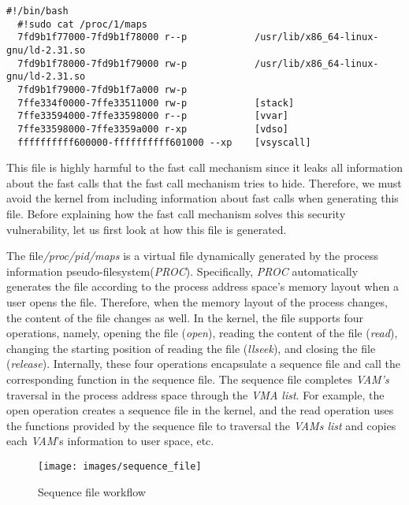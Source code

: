  
\begin{lstlisting}[style=BASHStyle]
  #!/bin/bash
  #!sudo cat /proc/1/maps
  7fd9b1f77000-7fd9b1f78000 r--p            /usr/lib/x86_64-linux-gnu/ld-2.31.so
  7fd9b1f78000-7fd9b1f79000 rw-p            /usr/lib/x86_64-linux-gnu/ld-2.31.so
  7fd9b1f79000-7fd9b1f7a000 rw-p  
  7ffe334f0000-7ffe33511000 rw-p            [stack]
  7ffe33594000-7ffe33598000 r--p            [vvar]
  7ffe33598000-7ffe3359a000 r-xp            [vdso]
  ffffffffff600000-ffffffffff601000 --xp    [vsyscall]
\end{lstlisting}

This file is highly harmful to the fast call mechanism since 
it leaks all information about the fast calls that the fast call 
mechanism tries to hide. Therefore, we must avoid the kernel from 
including information about fast calls when generating this file. 
Before explaining how the fast call mechanism solves this security 
vulnerability, let us first look at how this file is generated.

The file\emph{/proc/pid/maps} is a virtual file dynamically
generated by the process information pseudo-filesystem\cite{23}(\emph{PROC}). 
Specifically, \emph{PROC} automatically generates the file according to 
the process address space's memory layout when a user opens the file. 
Therefore, when the memory layout of the process changes, the content 
of the file changes as well. In the kernel, the file supports four operations, 
namely, opening the file (\emph{open}), reading the content of the file (\emph{read}), 
changing the starting position of reading the file (\emph{llseek}), and 
closing the file (\emph{release}).  Internally, these four operations 
encapsulate a sequence file\cite{24} and call the corresponding function in the sequence file.
The sequence file completes \emph{VAM's} traversal in the process address space 
through the \emph{VMA list}. For example, the open operation 
creates a sequence file in the kernel, and the read operation uses the 
functions provided by the sequence file to traversal the \emph{VAMs list} and copies 
each \emph{VAM}'s information to user space, etc.





\begin{figure}[tbp]
  \centering
  \texttt{[image: images/sequence\_file]}
  \caption[Short description]{Sequence file workflow}
  \label{fig:sequence_file}
\end{figure}

